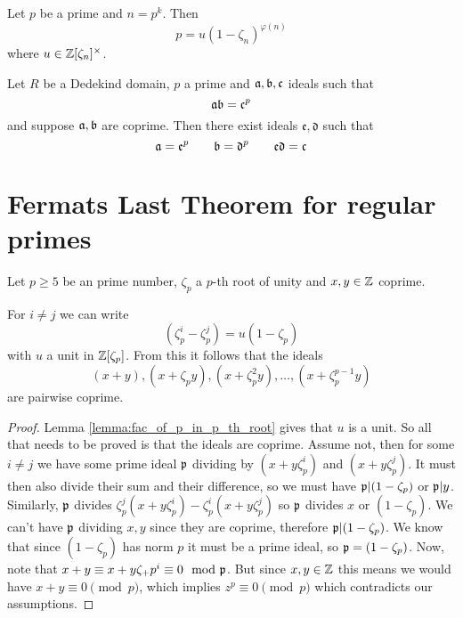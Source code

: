 \begin{lemma}\label{lemma:fac_of_p_in_p_th_root}
	Let $p$ be a prime and $n=p^k$. Then \[p=u(1-\zeta_n)^{\varphi(n)}\] where $u \in \mathbb{Z}[\zeta_n]^{\times}$.
\end{lemma}

\begin{lemma}\label{lemma:ideals_mult_to_power}
	Let $R$ be a Dedekind domain, $p$ a prime and $\mathfrak{a},\mathfrak{b},\mathfrak{c}$ ideals such that \[\mathfrak{a}\mathfrak{b}=\mathfrak{c}^p\] and suppose $\mathfrak{a},\mathfrak{b}$ are coprime. Then there exist ideals $\mathfrak{e},\mathfrak{d}$ such that \[\mathfrak{a}=\mathfrak{e}^p \qquad \mathfrak{b}=\mathfrak{d}^p \qquad \mathfrak{e}\mathfrak{d}=\mathfrak{c}\]
\end{lemma}


\section{Fermats Last Theorem for regular primes}

\begin{lemma}\label{lem:flt_fact_2}
	Let $p \geq 5$ be an prime number, $\zeta_p$ a $p$-th root of unity and $x, y \in \mathbb{Z}$ coprime.
	
	 For $i \neq j$ we can write \[(\zeta_p^i-\zeta_p^j)=u(1-\zeta_p)\] with $u$ a unit in $\mathbb{Z}[\zeta_p]$. From this it follows that the ideals \[(x+y),(x+\zeta_py),(x+\zeta_p^2y),\dots,(x+\zeta_p^{p-1}y)\] are pairwise coprime.
\end{lemma}

\begin{proof}
	 Lemma \ref{lemma:fac_of_p_in_p_th_root} gives that $u$ is a unit. So all that needs to be proved is that the ideals are coprime. Assume not, then for some $i \neq j$ we have some prime ideal $\mathfrak{p}$ dividing by $(x+y\zeta_p^i)$ and $(x+y\zeta_p^j)$. It must then also divide their sum and their difference, so we must have $\mathfrak{p} | (1-\zeta_p)$ or $\mathfrak{p} | y$. Similarly, $\mathfrak{p}$ divides $\zeta_p^j(x+y\zeta_p^i)-\zeta_p^i(x+y\zeta_p^j)$ so $\mathfrak{p}$ divides $x$ or $(1-\zeta_p)$. We can't have $\mathfrak{p}$ dividing $x,y$ since they are coprime, therefore $\mathfrak{p} |(1-\zeta_p)$. We know that since $(1-\zeta_p)$ has norm $p$ it must be a prime ideal, so $\mathfrak{p}=(1-\zeta_p)$. Now, note that $x+y \equiv x+y\zeta_+p^i \equiv 0 \mod {\mathfrak{p}}$. But since $x,y \in \mathbb{Z}$ this means we would have $x+y \equiv 0 \pmod p$, which implies $z^p \equiv 0 \pmod p$ which contradicts our assumptions.
\end{proof}

